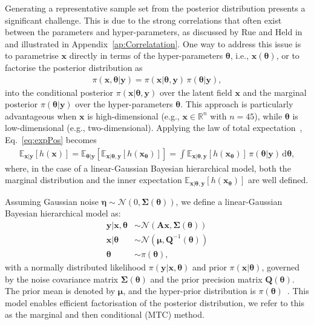 Generating a representative sample set from the posterior distribution presents a significant challenge. This is due to the strong correlations that often exist between the parameters and hyper-parameters, as discussed by Rue and Held in \cite{rue2005gaussian} and illustrated in Appendix~\ref{ap:Correlatation}.
One way to address this issue is to parametrise $\bm{x}$ directly in terms of the hyper-parameters $\bm{\theta}$, i.e., $\bm{x}(\bm{\theta})$, or to factorise the posterior distribution as
\begin{align}
	\pi(\bm{x}, \bm{\theta} |  \bm{y}) = \pi(\bm{x} |  \bm{\theta}, \bm{y}) \, \pi(\bm{\theta} |   \bm{y}),
\end{align}
into the conditional posterior $\pi(\bm{x} |  \bm{\theta}, \bm{y})$ over the latent field $\bm{x}$ and the marginal posterior $\pi(\bm{\theta} |  \bm{y})$ over the hyper-parameters $\bm{\theta}$.
This approach is particularly advantageous when $\bm{x}$ is high-dimensional (e.g., $\bm{x} \in \mathbb{R}^n$ with $n = 45$), while $\bm{\theta}$ is low-dimensional (e.g., two-dimensional).  
Applying the law of total expectation~\cite{champ2022generalizedlawtotalcovariance}, Eq.~\eqref{eq:expPos} becomes
\begin{align}
	\mathbb{E}_{\bm{x} |  \bm{y}} [h(\bm{x})] 
	= \mathbb{E}_{\bm{\theta} |  \bm{y}} \left[ \mathbb{E}_{\bm{x} |  \bm{\theta}, \bm{y}} [h(\bm{x}_{\bm{\theta}})] \right] 
	= \int \mathbb{E}_{\bm{x} |  \bm{\theta}, \bm{y}} \left[ h(\bm{x}_{\bm{\theta}}) \right] \, \pi(\bm{\theta} |  \bm{y}) \, \mathrm{d}\bm{\theta},
	\label{eq:MargExpPos}
\end{align}
where, in the case of a linear-Gaussian Bayesian hierarchical model, both the marginal distribution and the inner expectation $\mathbb{E}_{\bm{x} |  \bm{\theta}, \bm{y}} \left[ h(\bm{x}_{\bm{\theta}}) \right]$ are well defined.

Assuming Gaussian noise $\bm{\eta} \sim \mathcal{N}(0, \bm{\Sigma}(\bm{\theta}))$, we define a linear-Gaussian Bayesian hierarchical model as:
\begin{subequations}
	\begin{align}
		\bm{y} |  \bm{x}, \bm{\theta} &\sim \mathcal{N}(\bm{A} \bm{x}, \bm{\Sigma}(\bm{\theta})) \label{eq:likelihood} \\
		\bm{x} |  \bm{\theta} &\sim \mathcal{N}(\bm{\mu}, \bm{Q}^{-1}(\bm{\theta})) \label{eq:xPrior} \\
		\bm{\theta} &\sim \pi(\bm{\theta}) \label{eq:gammaPrior},
	\end{align}
	\label{eq:BayMode}
\end{subequations}
with a normally distributed likelihood $\pi(\bm{y} |  \bm{x}, \bm{\theta})$ and prior $\pi(\bm{x} |  \bm{\theta})$, governed by the noise covariance matrix $\bm{\Sigma}(\bm{\theta})$ and the prior precision matrix $\bm{Q}(\bm{\theta})$. The prior mean is denoted by $\bm{\mu}$, and the hyper-prior distribution is $\pi(\bm{\theta})$~\cite{fox2016fast}.
This model enables efficient factorisation of the posterior distribution, we refer to this as the marginal and then conditional (MTC) method.



